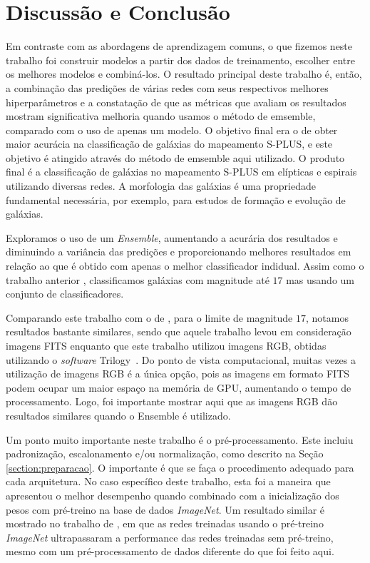\section{Discussão e Conclusão}
Em contraste com as abordagens de aprendizagem comuns, o que fizemos neste trabalho foi construir modelos a partir dos dados de treinamento, escolher entre os melhores modelos e combiná-los. O resultado principal deste trabalho é, então, a combinação das predições de várias redes com seus respectivos melhores hiperparâmetros e a constatação de que as métricas que avaliam os resultados mostram significativa melhoria quando usamos o método de emsemble, comparado com o uso de apenas um modelo. O objetivo final era o de obter maior acurácia na classificação de galáxias do mapeamento S-PLUS, e este objetivo é atingido através do método de emsemble aqui utilizado. O produto final é a classificação de galáxias no mapeamento S-PLUS em elípticas e espirais utilizando diversas redes. A morfologia das galáxias é uma propriedade fundamental necessária, por exemplo, para estudos de formação e evolução de galáxias.

Exploramos o uso de um \emph{Ensemble}, aumentando a acurária dos resultados e diminuindo a variância das predições e proporcionando melhores resultados em relação ao que é obtido com apenas o melhor classificador indidual. Assim como o trabalho anterior \cite{bom2021}, classificamos galáxias com magnitude até $17$ mas usando um conjunto de classificadores.

Comparando este trabalho com o de \cite{bom2021}, para o limite de magnitude $17$, notamos resultados bastante similares, sendo que aquele trabalho levou em consideração imagens FITS enquanto que este trabalho utilizou imagens RGB, obtidas utilizando o \emph{software} Trilogy~\cite{coe2012clash}. Do ponto de vista computacional, muitas vezes a utilização de imagens RGB é a única opção, pois as imagens em formato FITS podem ocupar um maior espaço na memória de GPU, aumentando o tempo de processamento. Logo, foi importante mostrar aqui que as imagens RGB dão resultados similares quando o Ensemble é utilizado.

Um ponto muito importante neste trabalho é o pré-processamento. Este incluiu padronização, escalonamento e/ou normalização, como descrito na Seção \ref{section:preparacao}. O importante é que se faça o procedimento adequado para cada arquitetura. No caso específico deste trabalho, esta foi a maneira que apresentou o melhor desempenho quando combinado com a inicialização dos pesos com pré-treino na base de dados \emph{ImageNet}. Um resultado similar é mostrado no trabalho de \cite{bom2021}, em que as redes treinadas usando o pré-treino \emph{ImageNet} ultrapassaram a performance das redes treinadas sem pré-treino, mesmo com um pré-processamento de dados diferente do que foi feito aqui.

